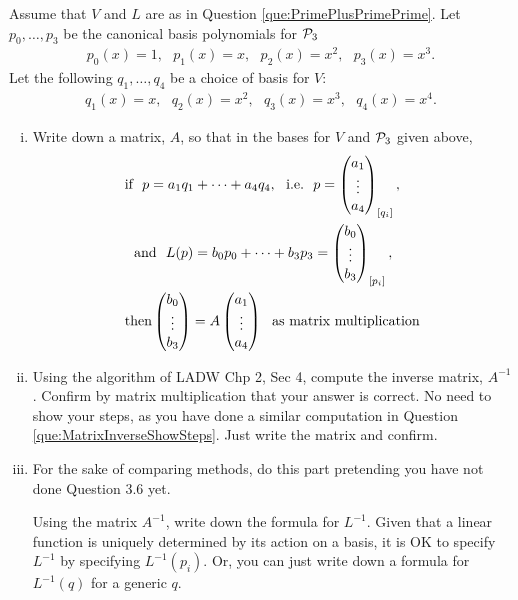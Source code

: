 \begin{question}
    \normalfont

    Assume that $V$ and $L$ are as in Question \ref{que:PrimePlusPrimePrime}. Let $p_0,\dots, p_3$ be the canonical basis polynomials for $\P_3$
    \begin{align*}
        p_0(x) = 1,\ \ \
        p_1(x) = x,\ \ \
        p_2(x) = x^2,\ \ \
        p_3(x) = x^3.
    \end{align*}
    Let the following $q_1,\dots, q_4$ be a choice of basis for $V$:
    \begin{align*}
        q_1(x) = x,\ \ \
        q_2(x) = x^2,\ \ \
        q_3(x) = x^3,\ \ \
        q_4(x) = x^4.
    \end{align*}

    \begin{enumerate}[(i)]
        \item Write down a matrix, $A$, so that in the bases for $V$ and $\P_3$ given above,
              \begin{align*}
                   & \text{if}\ \
                  p = a_1q_1+ \cdots + a_4 q_4,\ \ \text{i.e.}\ \ p=\ColVecThree{a_1}{\vdots}{a_4}_{[q_i]}, \\
                   & \ \ \text{and}\ \
                  L(p) = b_0p_0 + \cdots + b_3p_3 = \ColVecThree{b_0}{\vdots}{b_3}_{[p_i]},                 \\
                   & \text{then}
                  \ColVecThree{b_0}{\vdots}{b_3}
                  = A\ColVecThree{a_1}{\vdots}{a_4}\ \ \text{as matrix multiplication}
              \end{align*}

        \item Using the algorithm of LADW Chp 2, Sec 4, compute the inverse matrix, $A^{-1}$.  Confirm by matrix multiplication that your answer is correct.  No need to show your steps, as you have done a similar computation in Question \ref{que:MatrixInverseShowSteps}.  Just write the matrix and confirm.

        \item  For the sake of comparing methods, do this part pretending you have not done Question 3.6 yet.


              Using the matrix $A^{-1}$, write down the formula for $L^{-1}$.  Given that a linear function is uniquely determined by its action on a basis, it is OK to specify $L^{-1}$ by specifying $L^{-1}(p_i)$.  Or, you can just write down a formula for $L^{-1}(q)$ for a generic $q$.
    \end{enumerate}
\end{question}
